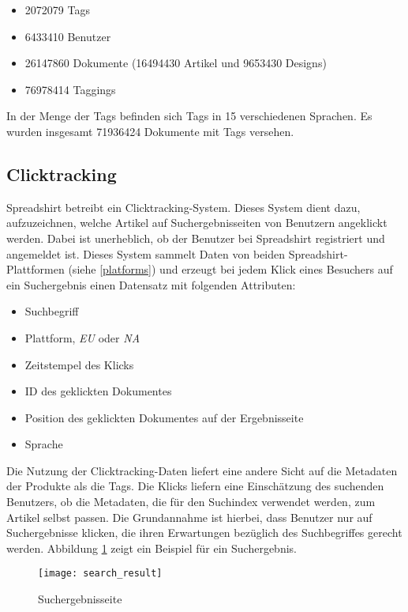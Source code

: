 \begin{itemize}
    \item \num{2072079} Tags
    \item \num{6433410} Benutzer
    \item \num{26147860} Dokumente (\num{16494430} Artikel und \num{9653430} Designs)
    \item \num{76978414} Taggings
\end{itemize}

In der Menge der Tags befinden sich Tags in \num{15} verschiedenen Sprachen. Es wurden insgesamt \num{71936424} Dokumente mit Tags versehen.

\subsection{Clicktracking}
Spreadshirt betreibt ein Clicktracking-System. Dieses System dient dazu, aufzuzeichnen, welche Artikel auf Suchergebnisseiten von Benutzern angeklickt werden. Dabei ist unerheblich, ob der Benutzer bei Spreadshirt registriert und angemeldet ist. Dieses System sammelt Daten von beiden Spreadshirt-Plattformen (siehe \ref{platforms}) und erzeugt bei jedem Klick eines Besuchers auf ein Suchergebnis einen Datensatz mit folgenden Attributen:

\begin{itemize}
    \item Suchbegriff
    \item Plattform, \emph{EU} oder \emph{NA}
    \item Zeitstempel des Klicks
    \item ID des geklickten Dokumentes
    \item Position des geklickten Dokumentes auf der Ergebnisseite
    \item Sprache
\end{itemize}

Die Nutzung der Clicktracking-Daten liefert eine andere Sicht auf die Metadaten der Produkte als die Tags. Die Klicks liefern eine Einschätzung des suchenden Benutzers, ob die Metadaten, die für den Suchindex verwendet werden, zum Artikel selbst passen. Die Grundannahme ist hierbei, dass Benutzer nur auf Suchergebnisse klicken, die ihren Erwartungen bezüglich des Suchbegriffes gerecht werden. Abbildung \ref{fig:search_result} zeigt ein Beispiel für ein Suchergebnis.

\begin{figure}
\centering
\texttt{[image: search\_result]}
\caption{Suchergebnisseite}
\label{fig:search_result}
\end{figure}

